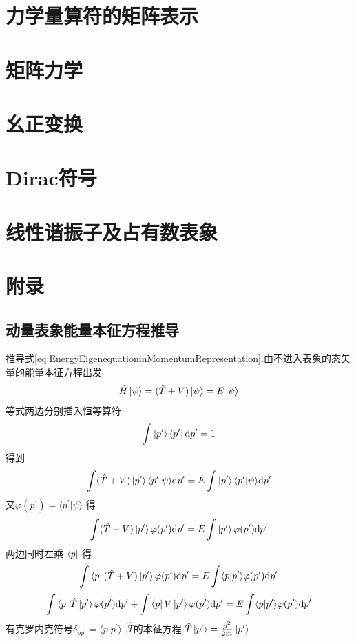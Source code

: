\documentclass[12pt, a4paper, oneside, UTF8]{ctexbook}
\begin{document}
\section{力学量算符的矩阵表示}
\section{矩阵力学}
\section{幺正变换}
\section{Dirac符号}
\section{线性谐振子及占有数表象}

 


\newpage
\section{附录}
\subsection{动量表象能量本征方程推导}
推导式\eqref{eq:EnergyEigenequationinMomentumRepresentation}.由不进入表象的态矢量的能量本征方程出发
\begin{equation}
    \hat{H}\ket{\psi}=(\hat{T}+V)\ket{\psi}=E\ket{\psi}
\end{equation}
等式两边分别插入恒等算符
\begin{equation}
    \int\ket{p^{\prime}}\bra{p^{\prime}}\mathrm{d}p^{\prime} = 1 
\end{equation}
得到
\begin{equation}
    \int(\hat{T}+V)\ket{p^{\prime}}\langle p^{\prime}|\psi \rangle\mathrm{d}p^{\prime}=E\int\ket{p^{\prime}}\langle p^{\prime}|\psi \rangle\mathrm{d}p^{\prime}
\end{equation}
又$\varphi(p^{\prime})=\langle p^{\prime}|\psi \rangle$ 得
\begin{equation}
    \int(\hat{T}+V)\ket{p^{\prime}}\varphi(p^{\prime})\mathrm{d}p^{\prime}=E\int\ket{p^{\prime}}\varphi(p^{\prime})\mathrm{d}p^{\prime}
\end{equation}
两边同时左乘 $\bra{p}$ 得
\begin{equation}
    \int \bra{p}(\hat{T}+V)\ket{p^{\prime}}\varphi(p^{\prime})\mathrm{d}p^{\prime}=E\int \langle p|p^{\prime} \rangle \varphi(p^{\prime})\mathrm{d}p^{\prime}
\end{equation}
\begin{equation}
    \int \bra{p}\hat{T}\ket{p^{\prime}}\varphi(p^{\prime})\mathrm{d}p^{\prime} +\int \bra{p}V\ket{p^{\prime}}\varphi(p^{\prime})\mathrm{d}p^{\prime}=E\int \langle p|p^{\prime} \rangle \varphi(p^{\prime})\mathrm{d}p^{\prime}
\end{equation}
有克罗内克符号$\delta_{pp^{\prime}}=\langle p|p^{\prime} \rangle$ ,$\hat{T}$的本征方程 $\hat{T}\ket{p^{\prime}}=\frac{p^2}{2m}\ket{p^{\prime}}$
\end{document}
